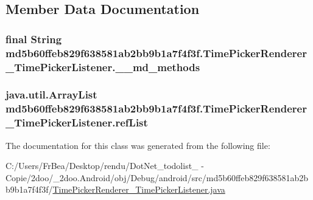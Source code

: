 \subsection{Member Data Documentation}
\hypertarget{classmd5b60ffeb829f638581ab2bb9b1a7f4f3f_1_1_time_picker_renderer___time_picker_listener_89be3c5d1a25817d66484c33310bfee7}{
\subsubsection[{\_\-\_\-md\_\-methods}]{\setlength{\rightskip}{0pt plus 5cm}final String {\bf md5b60ffeb829f638581ab2bb9b1a7f4f3f.TimePickerRenderer\_\-TimePickerListener.\_\-\_\-md\_\-methods}}}
\label{classmd5b60ffeb829f638581ab2bb9b1a7f4f3f_1_1_time_picker_renderer___time_picker_listener_89be3c5d1a25817d66484c33310bfee7}


\hypertarget{classmd5b60ffeb829f638581ab2bb9b1a7f4f3f_1_1_time_picker_renderer___time_picker_listener_18f8bcfd23756191ce3ea3ebc49860a8}{
\subsubsection[{refList}]{\setlength{\rightskip}{0pt plus 5cm}java.util.ArrayList {\bf md5b60ffeb829f638581ab2bb9b1a7f4f3f.TimePickerRenderer\_\-TimePickerListener.refList}}}
\label{classmd5b60ffeb829f638581ab2bb9b1a7f4f3f_1_1_time_picker_renderer___time_picker_listener_18f8bcfd23756191ce3ea3ebc49860a8}




The documentation for this class was generated from the following file:\begin{CompactItemize}
\item 
C:/Users/FrBea/Desktop/rendu/DotNet\_\-todolist\_ - Copie/2doo/\_\-2doo.Android/obj/Debug/android/src/md5b60ffeb829f638581ab2bb9b1a7f4f3f/\hyperlink{_time_picker_renderer___time_picker_listener_8java}{TimePickerRenderer\_\-TimePickerListener.java}\end{CompactItemize}
